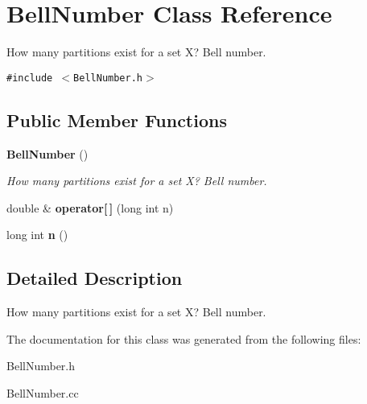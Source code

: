 \section{Bell\-Number Class Reference}
\label{classBellNumber}
How many partitions exist for a set X? Bell number.  


{\tt \#include $<$Bell\-Number.h$>$}

\subsection*{Public Member Functions}
\begin{CompactItemize}
\item 
{\bf Bell\-Number} ()\label{classBellNumber_a0}

\begin{CompactList}\small\item\em How many partitions exist for a set X? Bell number. \item\end{CompactList}\item 
double \& {\bf operator[$\,$]} (long int n)\label{classBellNumber_a1}

\item 
long int {\bf n} ()\label{classBellNumber_a2}

\end{CompactItemize}


\subsection{Detailed Description}
How many partitions exist for a set X? Bell number. 



The documentation for this class was generated from the following files:\begin{CompactItemize}
\item 
Bell\-Number.h\item 
Bell\-Number.cc\end{CompactItemize}
